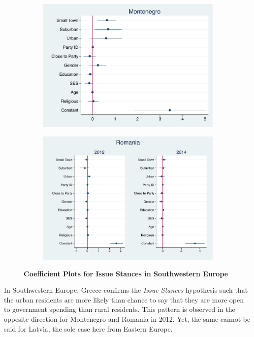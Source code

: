 \documentclass[12pt, titlepage]{article}
\newcommand\e{\emph}
\newcommand\tb{\textbf}
\begin{document}
\begin{figure}[H]
\begin{subfigure}[b]{0.475\textwidth}
		\includegraphics[width=\textwidth]{LibCoef/Montenegro}
	\end{subfigure}
	\quad
	\begin{subfigure}[b]{0.475\textwidth}   
		\centering 
		\includegraphics[width=\textwidth]{LibCoef/Romania}
	\end{subfigure}
	\caption[ \tb{Issue Stances - Southwestern Europe} ]
	{\tb {Coefficient Plots for Issue Stances in Southwestern Europe} }
	\label{SWEuro}
\end{figure}

In Southwestern Europe, Greece confirms the \e{Issue Stances} hypothesis such that the urban residents are more likely than chance to say that they are more open to government spending than rural residents. This pattern is observed in the oppesite direction for Montenegro and Romania in 2012. Yet, the same cannot be said for Latvia, the sole case here from Eastern Europe. 
\end{document}
